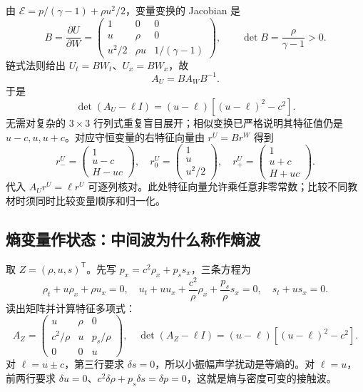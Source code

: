 由 $\mathcal E=p/(\gamma-1)+\rho u^2/2$，变量变换的 Jacobian 是
\begin{equation}
 B=\frac{\partial U}{\partial W}
 =\begin{pmatrix}1&0&0\\u&\rho&0\\u^2/2&\rho u&1/(\gamma-1)\end{pmatrix},
 \qquad\det B=\frac\rho{\gamma-1}>0.
\end{equation}
链式法则给出 $U_t=BW_t$、$U_x=BW_x$，故
\begin{equation}
 A_U=BA_WB^{-1}.
\end{equation}
于是
\begin{equation}
 \det(A_U-\ell I)=(u-\ell)[(u-\ell)^2-c^2].
\end{equation}
无需对复杂的 $3\times3$ 行列式重复盲目展开；相似变换已严格说明其特征值仍是 $u-c,u,u+c$。对应守恒变量的右特征向量由 $r^U=Br^W$ 得到
\begin{equation}
 r_-^U=\begin{pmatrix}1\\u-c\\H-uc\end{pmatrix},\quad
 r_0^U=\begin{pmatrix}1\\u\\u^2/2\end{pmatrix},\quad
 r_+^U=\begin{pmatrix}1\\u+c\\H+uc\end{pmatrix}.
\end{equation}
代入 $A_Ur^U=\ell r^U$ 可逐列核对。此处特征向量允许乘任意非零常数；比较不同教材时须同时比较变量顺序和归一化。

\subsection{熵变量作状态：中间波为什么称作熵波}

取 $Z=(\rho,u,s)^{\mathsf T}$。先写 $p_x=c^2\rho_x+p_s s_x$，三条方程为
\begin{equation}
 \rho_t+u\rho_x+\rho u_x=0,\quad
 u_t+u u_x+\frac{c^2}{\rho}\rho_x+\frac{p_s}{\rho}s_x=0,\quad
 s_t+u s_x=0.
\end{equation}
读出矩阵并计算特征多项式：
\begin{equation}
 A_Z=\begin{pmatrix}u&\rho&0\\c^2/\rho&u&p_s/\rho\\0&0&u\end{pmatrix},
 \quad\det(A_Z-\ell I)=(u-\ell)[(u-\ell)^2-c^2].
\end{equation}
对 $\ell=u\pm c$，第三行要求 $\delta s=0$，所以小振幅声学扰动是等熵的。对 $\ell=u$，前两行要求 $\delta u=0$、$c^2\delta\rho+p_s\delta s=\delta p=0$，这就是熵与密度可变的接触波。


